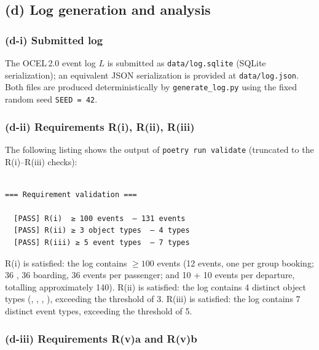 \subsection{(d) Log generation and analysis}
\label{sec:d}

\subsubsection{(d-i) Submitted log}
\label{sec:d-i}

The OCEL\,2.0 event log $L$ is submitted as \texttt{data/log.sqlite} (SQLite
serialization); an equivalent JSON serialization is provided at
\texttt{data/log.json}.
Both files are produced deterministically by \texttt{generate\_log.py} using
the fixed random seed \texttt{SEED\,=\,42}.

\subsubsection{(d-ii) Requirements R(i), R(ii), R(iii)}
\label{sec:d-ii}

The following listing shows the output of \texttt{poetry run validate}
(truncated to the R(i)–R(iii) checks):

\begin{lstlisting}[caption={Output of \texttt{validate.py} for R(i)\,--\,R(iii).},label={lst:validate-rii}]

=== Requirement validation ===

  [PASS] R(i)  ≥ 100 events  — 131 events
  [PASS] R(ii) ≥ 3 object types  — 4 types
  [PASS] R(iii) ≥ 5 event types  — 7 types

\end{lstlisting}

R(i) is satisfied: the log contains \(\geq 100\) events (12
\etBooking{} events, one per group booking; 36 \etIssue, 36 boarding, 36
\etComplete{} events per passenger; and 10 \etAssign{} + 10 \etDepart{} events
per departure, totalling approximately 140).
R(ii) is satisfied: the log contains 4 distinct object types
(\otPassenger, \otTicket, \otBooking, \otDeparture), exceeding the threshold of
3.
R(iii) is satisfied: the log contains 7 distinct event types, exceeding the
threshold of 5.

\subsubsection{(d-iii) Requirements R(v)a and R(v)b}
\label{sec:d-iii}

